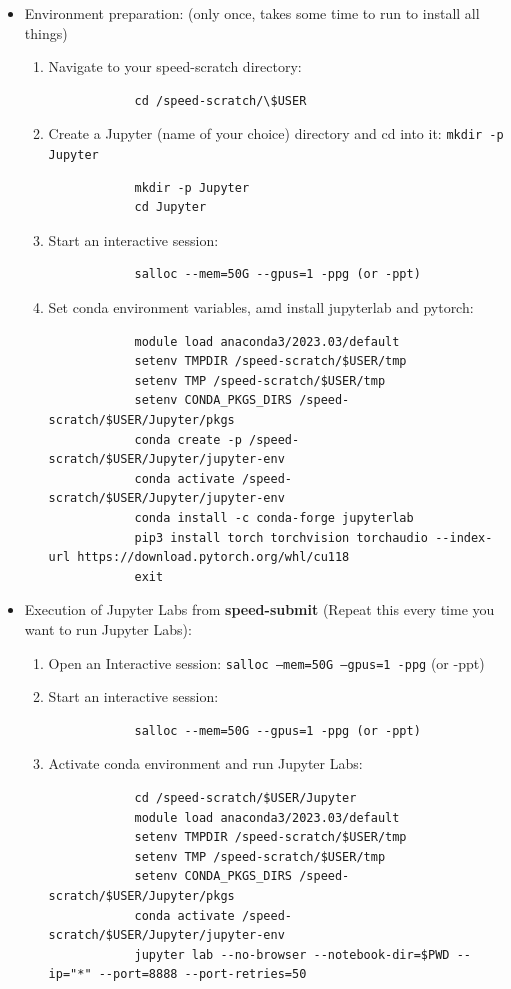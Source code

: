 \begin{itemize}
	\item Environment preparation: (only once, takes some time to run to install all things)
	\begin{enumerate}
		\item Navigate to your speed-scratch directory:
		\begin{verbatim}
			cd /speed-scratch/\$USER
		\end{verbatim}

		\item Create a Jupyter (name of your choice) directory and cd into it: \texttt{mkdir -p Jupyter}
		\begin{verbatim}
			mkdir -p Jupyter
			cd Jupyter
		\end{verbatim}

		\item Start an interactive session:
		\begin{verbatim}
			salloc --mem=50G --gpus=1 -ppg (or -ppt)
		\end{verbatim}
		
		\item Set conda environment variables, amd install jupyterlab and pytorch:
		\small
		\begin{verbatim}
			module load anaconda3/2023.03/default
			setenv TMPDIR /speed-scratch/$USER/tmp
			setenv TMP /speed-scratch/$USER/tmp
			setenv CONDA_PKGS_DIRS /speed-scratch/$USER/Jupyter/pkgs 
			conda create -p /speed-scratch/$USER/Jupyter/jupyter-env 
			conda activate /speed-scratch/$USER/Jupyter/jupyter-env
			conda install -c conda-forge jupyterlab
			pip3 install torch torchvision torchaudio --index-url https://download.pytorch.org/whl/cu118
			exit
		\end{verbatim}
		\normalsize
	\end{enumerate}

	\item Execution of Jupyter Labs from \textbf{speed-submit} (Repeat this every time you want to run Jupyter Labs):
	\begin{enumerate}
		\item Open an Interactive session: \texttt{salloc --mem=50G --gpus=1 -ppg} (or -ppt)
		\item Start an interactive session:
		\begin{verbatim}
			salloc --mem=50G --gpus=1 -ppg (or -ppt)
		\end{verbatim}

		\item Activate conda environment and run Jupyter Labs:
		\begin{verbatim}
			cd /speed-scratch/$USER/Jupyter
			module load anaconda3/2023.03/default
			setenv TMPDIR /speed-scratch/$USER/tmp
			setenv TMP /speed-scratch/$USER/tmp
			setenv CONDA_PKGS_DIRS /speed-scratch/$USER/Jupyter/pkgs
			conda activate /speed-scratch/$USER/Jupyter/jupyter-env
			jupyter lab --no-browser --notebook-dir=$PWD --ip="*" --port=8888 --port-retries=50
		\end{verbatim}


\end{enumerate}
\end{itemize}

